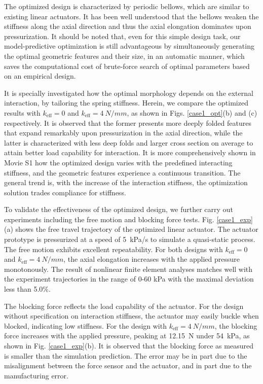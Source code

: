 \documentclass[journal]{IEEEtran}
\theoremstyle{definition}
\begin{document}
The optimized design is characterized by periodic bellows, which are similar to existing linear actuators\cite{hashem2020design}. It has been well understood that the bellows weaken the stiffness along the axial direction and thus the axial elongation dominates upon pressurization. It should be noted that, even for this simple design task, our model-predictive optimization is still advantageous by simultaneously generating the optimal geometric features and their size, in an automatic manner, which saves the computational cost of brute-force search of optimal parameters based on an empirical design\cite{dammer2018design}.

It is specially investigated how the optimal morphology depends on the external interaction, by tailoring the spring stiffness. Herein, we compare the optimized results with $k_\text{eff}=0$ and $k_\text{eff}=\SI{4}{N/mm}$, as shown in Figs. \ref{case1_opt}(b) and (c) respectively. It is observed that the former presents more deeply folded features that expand remarkably upon pressurization in the axial direction, while the latter is characterized with less deep folds and larger cross section on average to attain better load capability for interaction. It is more comprehensively shown in Movie S1 how the optimized design varies with the predefined interacting stiffness, and the geometric features experience a continuous transition. The general trend is, with the increase of the interaction stiffness, the optimization solution trades compliance for stiffness.

To validate the effectiveness of the optimized design, we further carry out experiments including the free motion and blocking force tests. Fig. \ref{case1_exp}(a) shows the free travel trajectory of the optimized linear actuator. The actuator prototype is pressurized at a speed of \SI{5}{kPa/s} to simulate a quasi-static process. The free motion exhibits excellent repeatability. For both designs with $k_\text{eff}=0$ and $k_\text{eff}=\SI{4}{N/mm}$, the axial elongation increases with the applied pressure monotonously. The result of nonlinear finite element analyses matches well with the experiment trajectories in the range of 0-60 kPa with the maximal deviation less than 5.0\%.

The blocking force reflects the load capability of the actuator. For the design without specification on interaction stiffness, the actuator may easily buckle when blocked, indicating low stiffness. For the design with $k_\text{eff}=\SI{4}{N/mm}$, the blocking force increases with the applied pressure, peaking at \SI{12.15}{N} under \SI{54}{kPa}, as shown in Fig. \ref{case1_exp}(b). It is observed that the blocking force as measured is smaller than the simulation prediction. The error may be in part due to the misalignment between the force sensor and the actuator, and in part due to the manufacturing error.
\end{document}
